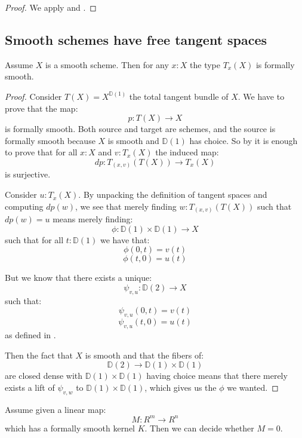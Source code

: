 \begin{proof}
We apply  and .
\end{proof}



\subsection{Smooth schemes have free tangent spaces}


\begin{lemma}\label{smooth-implies-smooth-tangent}
Assume $X$ is a smooth scheme. Then for any $x:X$ the type $T_x(X)$ is formally smooth.
\end{lemma}

\begin{proof}
Consider $T(X) = X^{\mathbb{D}(1)}$ the total tangent bundle of $X$. We have to prove that the map:
\[p:T(X)\to X\]
is formally smooth. Both source and target are schemes, and the source is formally smooth because $X$ is smooth and $\mathbb{D}(1)$ has choice. So by  it is enough to prove that for all $x:X$ and $v:T_x(X)$ the induced map:
\[dp:T_{(x,v)}(T(X))\to T_x(X)\]
is surjective. 

Consider $u:T_x(X)$. By unpacking the definition of tangent spaces and computing $dp(w)$, we see that merely finding $w:T_{(x,v)}(T(X))$ such that $dp(w) = u$ means merely finding:
\[\phi : \mathbb{D}(1) \times \mathbb{D}(1) \to X\]
such that for all $t:\mathbb{D}(1)$ we have that:
\[\phi(0,t) = v(t)\]
\[\phi(t,0) = u(t)\]

But we know that there exists a unique:
\[\psi_{v,u} : \mathbb{D}(2)\to X\]
such that:
\[\psi_{v,u}(0,t) = v(t)\]
\[\psi_{v,u}(t,0) = u(t)\]
as defined in .

Then the fact that $X$ is smooth and that the fibers of:
\[\mathbb{D}(2) \to\mathbb{D}(1) \times \mathbb{D}(1) \]
are closed dense with $\mathbb{D}(1) \times \mathbb{D}(1)$ having choice means that there merely exists a lift of $\psi_{v,w}$ to $\mathbb{D}(1) \times \mathbb{D}(1)$, which gives us the $\phi$ we wanted.
\end{proof}

\begin{lemma}\label{smooth-kernel-decidable}
Assume given a linear map:
\[M:R^m\to R^n\] 
which has a formally smooth kernel $K$. Then we can decide whether $M=0$.
\end{lemma}

